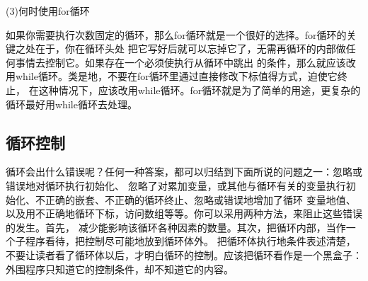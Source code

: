 \documentclass{article}
\begin{document}
\par
(3)何时使用for循环
\par
如果你需要执行次数固定的循环，那么for循环就是一个很好的选择。for循环的关键之处在于，你在循环头处
把它写好后就可以忘掉它了，无需再循环的内部做任何事情去控制它。如果存在一个必须使执行从循环中跳出
的条件，那么就应该改用while循环。类是地，不要在for循环里通过直接修改下标值得方式，迫使它终止，
在这种情况下，应该改用while循环。for循环就是为了简单的用途，更复杂的循环最好用while循环去处理。

\subsection{循环控制}
循环会出什么错误呢？任何一种答案，都可以归结到下面所说的问题之一：忽略或错误地对循环执行初始化、
忽略了对累加变量，或其他与循环有关的变量执行初始化、不正确的嵌套、不正确的循环终止、忽略或错误地增加了循环
变量地值、以及用不正确地循环下标，访问数组等等。你可以采用两种方法，来阻止这些错误的发生。首先，
减少能影响该循环各种因素的数量。其次，把循环内部，当作一个子程序看待，把控制尽可能地放到循环体外。
把循环体执行地条件表述清楚，不要让读者看了循环体以后，才明白循环的控制。应该把循环看作是一个黑盒子：
外围程序只知道它的控制条件，却不知道它的内容。
\end{document}

